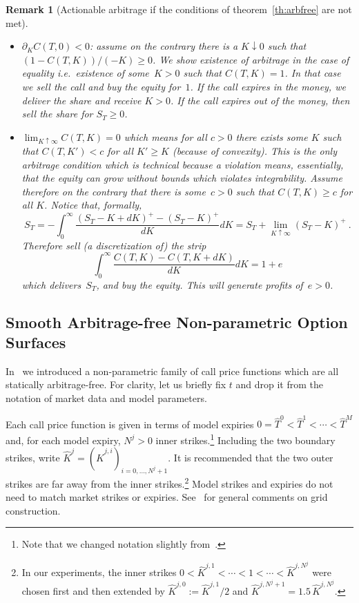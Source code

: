 \documentclass[11pt,a4paper]{article}
\newtheorem{remark}[definition]{Remark}
\begin{document}
\begin{remark}[Actionable arbitrage if the conditions of theorem~\ref{th:arbfree} are not met]
\begin{itemize}
    \item $\partial_K C(T,0)<0$: assume on the contrary there is a $K\downarrow 0$
    such that $(1-C(T,K))/(-K) \geq 0$. We show existence of
    arbitrage in the case of equality
    i.e.~existence of some~$K>0$ such that $C(T,K)=1$.
    In that case we sell the call and buy the equity for~$1$.
    If the call expires in the money, we deliver the share
    and receive $K>0$. If the call expires out of the money, then sell
    the share for $S_T\geq 0$.

    \item $\lim_{K\uparrow \infty} C(T,K) = 0$ which means for all $c>0$
    there exists some $K$ such that $C(T,K')<c$ for all $K'\geq K$ (because of convexity).
    This is the only arbitrage condition which is technical because a violation means,
    essentially, that the equity can grow without bounds which violates
    integrability.
    Assume therefore on the contrary
    that there is some~$c>0$ such that $C(T,K)\geq c$ for all $K$.
    Notice that, formally,
    $$
        S_T = - \int_0^\infty \frac{ (S_T-K+dK)^+ - (S_T-K)^+ }{ dK } dK
            = S_T + \lim_{K\uparrow \infty} (S_T-K)^+ \ .
    $$
    Therefore sell (a discretization of) the strip
    $$
    \int_0^\infty \frac{ C(T,K) -  C(T,K+dK) }{ dK } dK = 1 + e
    $$
    which delivers~$S_T$, and buy the equity. This will generate profits of~$e>0$.
 \end{itemize}
\end{remark}

\subsection{Smooth Arbitrage-free Non-parametric Option Surfaces}
\label{sec:sanos}

In~\citet{SANOS2026} we introduced a non-parametric family
of call price functions which are all statically arbitrage-free. For clarity, let us briefly fix $t$ and drop it from the notation of market data
and model parameters.

Each call price function is given in terms of model expiries
$0 = \hat T^0 < \hat T^1 < \cdots < \hat T^M$ and, for each model expiry,
$N^j>0$ inner strikes.\footnote{Note that we changed notation slightly from~\citet{SANOS2026}.}  Including the two boundary strikes, write
$\hat K^j = (\hat K^{j,i})_{i=0,\ldots,N^j+1}$. It is recommended that the two outer strikes
are far away from the inner strikes.\footnote{
    In our experiments, the inner strikes
    $0<\hat K^{j,1}<\cdots<1<\cdots<\hat K^{j,N^j}$
    were chosen first and then extended by $\hat K^{j,0}:=\hat K^{j,1}/2$ and
    $\hat K^{j,N^j+1} = 1.5\,\hat K^{j,N^j}$.
}  Model strikes and expiries do not need to match
market strikes or expiries. See~\citet{SANOS2026} for general comments on grid construction.
\end{document}
